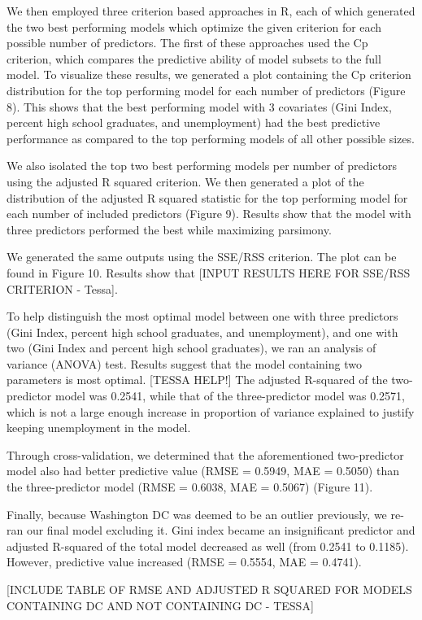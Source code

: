 \documentclass[
]{article}
\begin{document}
We then employed three criterion based approaches in R, each of which
generated the two best performing models which optimize the given
criterion for each possible number of predictors. The first of these
approaches used the Cp criterion, which compares the predictive ability
of model subsets to the full model. To visualize these results, we
generated a plot containing the Cp criterion distribution for the top
performing model for each number of predictors (Figure 8). This shows
that the best performing model with 3 covariates (Gini Index, percent
high school graduates, and unemployment) had the best predictive
performance as compared to the top performing models of all other
possible sizes.

We also isolated the top two best performing models per number of
predictors using the adjusted R squared criterion. We then generated a
plot of the distribution of the adjusted R squared statistic for the top
performing model for each number of included predictors (Figure 9).
Results show that the model with three predictors performed the best
while maximizing parsimony.

We generated the same outputs using the SSE/RSS criterion. The plot can
be found in Figure 10. Results show that {[}INPUT RESULTS HERE FOR
SSE/RSS CRITERION - Tessa{]}.

To help distinguish the most optimal model between one with three
predictors (Gini Index, percent high school graduates, and
unemployment), and one with two (Gini Index and percent high school
graduates), we ran an analysis of variance (ANOVA) test. Results suggest
that the model containing two parameters is most optimal. {[}TESSA
HELP!{]} The adjusted R-squared of the two-predictor model was 0.2541,
while that of the three-predictor model was 0.2571, which is not a large
enough increase in proportion of variance explained to justify keeping
unemployment in the model.

Through cross-validation, we determined that the aforementioned
two-predictor model also had better predictive value (RMSE = 0.5949, MAE
= 0.5050) than the three-predictor model (RMSE = 0.6038, MAE = 0.5067)
(Figure 11).

Finally, because Washington DC was deemed to be an outlier previously,
we re-ran our final model excluding it. Gini index became an
insignificant predictor and adjusted R-squared of the total model
decreased as well (from 0.2541 to 0.1185). However, predictive value
increased (RMSE = 0.5554, MAE = 0.4741).

{[}INCLUDE TABLE OF RMSE AND ADJUSTED R SQUARED FOR MODELS CONTAINING DC
AND NOT CONTAINING DC - TESSA{]}
\end{document}
